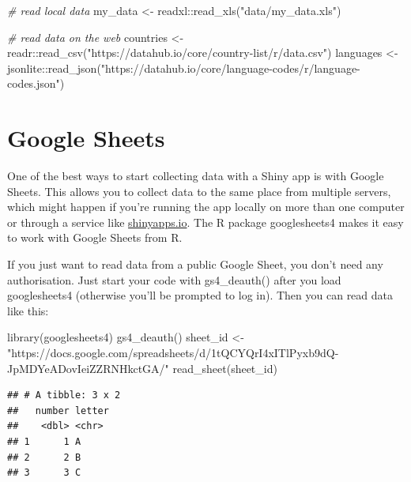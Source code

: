 \documentclass[
]{book}
\newenvironment{Shaded}{\begin{snugshade}}{\end{snugshade}}
\newcommand{\CommentTok}[1]{\textcolor[rgb]{0.56,0.35,0.01}{\textit{#1}}}
\newcommand{\FunctionTok}[1]{\textcolor[rgb]{0.00,0.00,0.00}{#1}}
\newcommand{\NormalTok}[1]{#1}
\newcommand{\OtherTok}[1]{\textcolor[rgb]{0.56,0.35,0.01}{#1}}
\newcommand{\SpecialCharTok}[1]{\textcolor[rgb]{0.00,0.00,0.00}{#1}}
\newcommand{\StringTok}[1]{\textcolor[rgb]{0.31,0.60,0.02}{#1}}
\begin{document}
\begin{Shaded}
\begin{Highlighting}[]
\CommentTok{\# read local data}
\NormalTok{my\_data }\OtherTok{\textless{}{-}}\NormalTok{ readxl}\SpecialCharTok{::}\FunctionTok{read\_xls}\NormalTok{(}\StringTok{"data/my\_data.xls"}\NormalTok{)}

\CommentTok{\# read data on the web}
\NormalTok{countries }\OtherTok{\textless{}{-}}\NormalTok{ readr}\SpecialCharTok{::}\FunctionTok{read\_csv}\NormalTok{(}\StringTok{"https://datahub.io/core/country{-}list/r/data.csv"}\NormalTok{)}
\NormalTok{languages }\OtherTok{\textless{}{-}}\NormalTok{ jsonlite}\SpecialCharTok{::}\FunctionTok{read\_json}\NormalTok{(}\StringTok{"https://datahub.io/core/language{-}codes/r/language{-}codes.json"}\NormalTok{)}
\end{Highlighting}
\end{Shaded}

\hypertarget{google_sheets}{%
\section{Google Sheets}\label{google_sheets}}

One of the best ways to start collecting data with a Shiny app is with Google Sheets. This allows you to collect data to the same place from multiple servers, which might happen if you're running the app locally on more than one computer or through a service like \href{https://shinyapps.io}{shinyapps.io}. The R package googlesheets4 makes it easy to work with Google Sheets from R.

If you just want to read data from a public Google Sheet, you don't need any authorisation. Just start your code with gs4\_deauth() after you load googlesheets4 (otherwise you'll be prompted to log in). Then you can read data like this:

\begin{Shaded}
\begin{Highlighting}[]
\FunctionTok{library}\NormalTok{(googlesheets4)}
\FunctionTok{gs4\_deauth}\NormalTok{()}
\NormalTok{sheet\_id }\OtherTok{\textless{}{-}} \StringTok{"https://docs.google.com/spreadsheets/d/1tQCYQrI4xITlPyxb9dQ{-}JpMDYeADovIeiZZRNHkctGA/"}
\FunctionTok{read\_sheet}\NormalTok{(sheet\_id)}
\end{Highlighting}
\end{Shaded}

\begin{verbatim}
## # A tibble: 3 x 2
##   number letter
##    <dbl> <chr> 
## 1      1 A     
## 2      2 B     
## 3      3 C
\end{verbatim}
\end{document}
